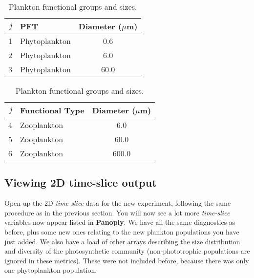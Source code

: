 \documentclass[11pt,fleqn]{book} %
\begin{document}
\vspace{-4mm}
\begin{table}[htp!]
\begin{center}
\caption{Plankton functional groups and sizes.}
\begin{tabular}{rlc}
\hline
$j$     & PFT                   & \multicolumn{1}{r}{Diameter ($\mu$m)}  \\
\hline
1       & Phytoplankton         & 0.6  \\
2       & Phytoplankton         & 6.0  \\
3       & Phytoplankton         & 60.0  \\
\hline
\end{tabular}
\begin{tabular}{rlc}
\hline
$j$     & Functional Type       & \multicolumn{1}{r}{Diameter ($\mu$m)}  \\
\hline
4       & Zooplankton           & 6.0  \\
5       & Zooplankton           & 60.0  \\
6       & Zooplankton           & 600.0  \\
\hline
\end{tabular}
\label{planktonconfig1}
\end{center}
\end{table}
\vspace{-4mm}


\subsection{Viewing 2D time-slice output}

Open up the 2D \textit{time-slice} data for the new experiment, following the same procedure as in the previous section. You will now see a lot more \textit{time-slice} variables now appear listed in \textbf{Panoply}. We have all the same diagnostics as before, plus some new ones relating to the new plankton populations you have just added. We also have a load of other arrays describing the size distribution and diversity of the photosynthetic community (non-phototrophic populations are ignored in these metrics). These were not included before, because there was only one phytoplankton population.
\end{document}
